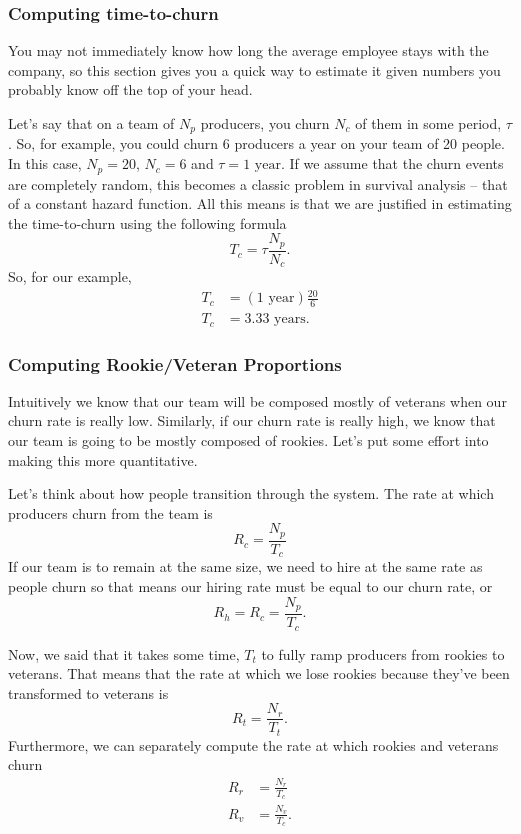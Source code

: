 \documentclass[paper=a4, fontsize=11pt abstract]{scrartcl}
\numberwithin{equation}{section}		%
\numberwithin{figure}{section}			%
\numberwithin{table}{section}				%
\begin{document}
\subsubsection{Computing time-to-churn}
You may not immediately know how long the average employee stays with the company, so this section gives you a quick way to estimate it given numbers you probably know off the top of your head.

Let's say that on a team of $N_p$ producers, you churn $N_c$ of them in some period, $\tau$.  So, for example, you could churn 6 producers a year on your team of 20 people.  In this case, $N_p=20$, $N_c=6$ and $\tau=1\text{ year}$. If we assume that the churn events are completely random, this becomes a classic problem in survival analysis -- that of a constant hazard function. All this means is that we are justified in estimating the time-to-churn using the following formula
\begin{equation}
    T_c = \tau \frac{N_p}{N_c}.
\end{equation}
So, for our example,
\begin{align}
    T_c &= \left(\text{1 year}\right)\frac{20}{6} \\
    T_c &= 3.33\text{ years}.
\end{align}

\subsubsection{Computing Rookie/Veteran Proportions}
Intuitively we know that our team will be composed mostly of veterans when our churn rate is really low.  Similarly, if our churn rate is really high, we know that our team is going to be mostly composed of rookies.  Let's put some effort into making this more quantitative.

Let's think about how people transition through the system.  The rate at which producers churn from the team is
\begin{equation}
    R_c = \frac{N_p}{T_c}
\end{equation}
If our team is to remain at the same size, we need to hire at the same rate as people churn so that means our hiring rate must be equal to our churn rate, or
\begin{equation}
    R_h = R_c = \frac{N_p}{T_c}.
\end{equation}

Now, we said that it takes some time, $T_t$ to fully ramp producers from rookies to veterans.  That means that the rate at which we lose rookies because they've been transformed to veterans is
\begin{equation}
    R_t = \frac{N_r}{T_t}.
\end{equation}
Furthermore, we can separately compute the rate at which rookies and veterans churn
\begin{align}
    R_r &= \frac{N_r}{T_c} \\
    R_v &= \frac{N_v}{T_c}.
\end{align}
\end{document}

